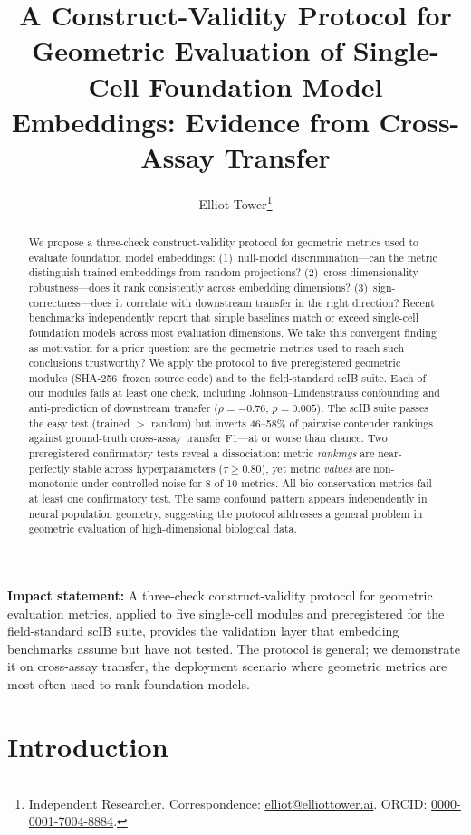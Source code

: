 \documentclass[10pt,letterpaper]{article}
\title{A Construct-Validity Protocol for Geometric Evaluation of Single-Cell Foundation Model Embeddings: Evidence from Cross-Assay Transfer}
\author{Elliot Tower\thanks{Independent Researcher. Correspondence: \href{mailto:elliot@elliottower.ai}{elliot@elliottower.ai}. ORCID: \href{https://orcid.org/0000-0001-7004-8884}{0000-0001-7004-8884}.}}
\begin{document}
\maketitle

\begin{abstract}
We propose a three-check construct-validity protocol for geometric metrics used to evaluate foundation model embeddings: (1)~null-model discrimination---can the metric distinguish trained embeddings from random projections? (2)~cross-dimensionality robustness---does it rank consistently across embedding dimensions? (3)~sign-correctness---does it correlate with downstream transfer in the right direction? Recent benchmarks independently report that simple baselines match or exceed single-cell foundation models across most evaluation dimensions. We take this convergent finding as motivation for a prior question: are the geometric metrics used to reach such conclusions trustworthy? We apply the protocol to five preregistered geometric modules (SHA-256--frozen source code) and to the field-standard scIB suite. Each of our modules fails at least one check, including Johnson--Lindenstrauss confounding and anti-prediction of downstream transfer ($\rho = -0.76$, $p = 0.005$). The scIB suite passes the easy test (trained $>$ random) but inverts 46--58\% of pairwise contender rankings against ground-truth cross-assay transfer F1---at or worse than chance. Two preregistered confirmatory tests reveal a dissociation: metric \emph{rankings} are near-perfectly stable across hyperparameters ($\bar{\tau} \geq 0.80$), yet metric \emph{values} are non-monotonic under controlled noise for 8 of 10 metrics. All bio-conservation metrics fail at least one confirmatory test. The same confound pattern appears independently in neural population geometry, suggesting the protocol addresses a general problem in geometric evaluation of high-dimensional biological data.
\end{abstract}

\noindent\textbf{Impact statement:} A three-check construct-validity protocol for geometric evaluation metrics, applied to five single-cell modules and preregistered for the field-standard scIB suite, provides the validation layer that embedding benchmarks assume but have not tested. The protocol is general; we demonstrate it on cross-assay transfer, the deployment scenario where geometric metrics are most often used to rank foundation models.


\section{Introduction}
\end{document}
